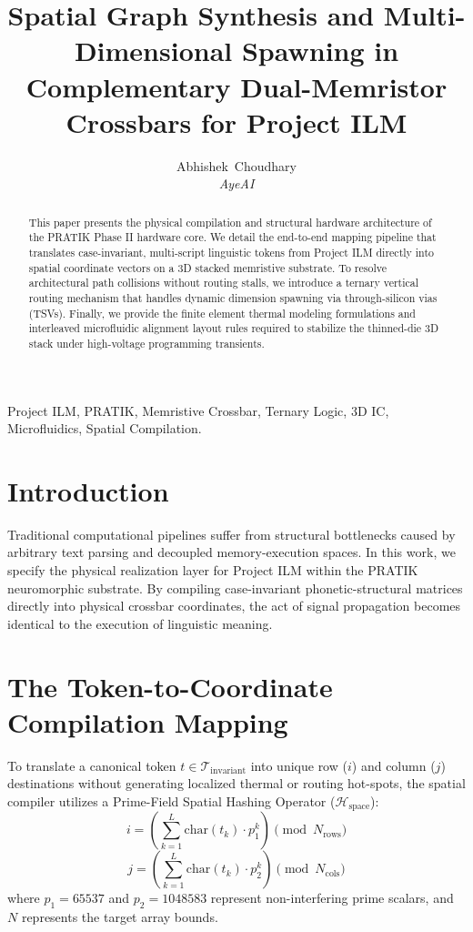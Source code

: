 \documentclass[journal,twocolumn,10pt]{IEEEtran}
\begin{document}
\title{Spatial Graph Synthesis and Multi-Dimensional Spawning in Complementary Dual-Memristor Crossbars for Project ILM}

\author{Abhishek~Choudhary\\
\textit{AyeAI}}

\maketitle

\begin{abstract}
This paper presents the physical compilation and structural hardware architecture of the PRATIK Phase II hardware core. We detail the end-to-end mapping pipeline that translates case-invariant, multi-script linguistic tokens from Project ILM directly into spatial coordinate vectors on a 3D stacked memristive substrate. To resolve architectural path collisions without routing stalls, we introduce a ternary vertical routing mechanism that handles dynamic dimension spawning via through-silicon vias (TSVs). Finally, we provide the finite element thermal modeling formulations and interleaved microfluidic alignment layout rules required to stabilize the thinned-die 3D stack under high-voltage programming transients.
\end{abstract}

\begin{IEEEkeywords}
Project ILM, PRATIK, Memristive Crossbar, Ternary Logic, 3D IC, Microfluidics, Spatial Compilation.
\end{IEEEkeywords}

\section{Introduction}
Traditional computational pipelines suffer from structural bottlenecks caused by arbitrary text parsing and decoupled memory-execution spaces. In this work, we specify the physical realization layer for Project ILM within the PRATIK neuromorphic substrate. By compiling case-invariant phonetic-structural matrices directly into physical crossbar coordinates, the act of signal propagation becomes identical to the execution of linguistic meaning.

\section{The Token-to-Coordinate Compilation Mapping}
To translate a canonical token $t \in \mathcal{T}_{\text{invariant}}$ into unique row ($i$) and column ($j$) destinations without generating localized thermal or routing hot-spots, the spatial compiler utilizes a Prime-Field Spatial Hashing Operator ($\mathcal{H}_{\text{space}}$):
\begin{equation}
i = \left( \sum_{k=1}^{L} \text{char}(t_k) \cdot p_1^k \right) \pmod{N_{\text{rows}}}
\end{equation}
\begin{equation}
j = \left( \sum_{k=1}^{L} \text{char}(t_k) \cdot p_2^k \right) \pmod{N_{\text{cols}}}
\end{equation}
where $p_1 = 65537$ and $p_2 = 1048583$ represent non-interfering prime scalars, and $N$ represents the target array bounds.
\end{document}
